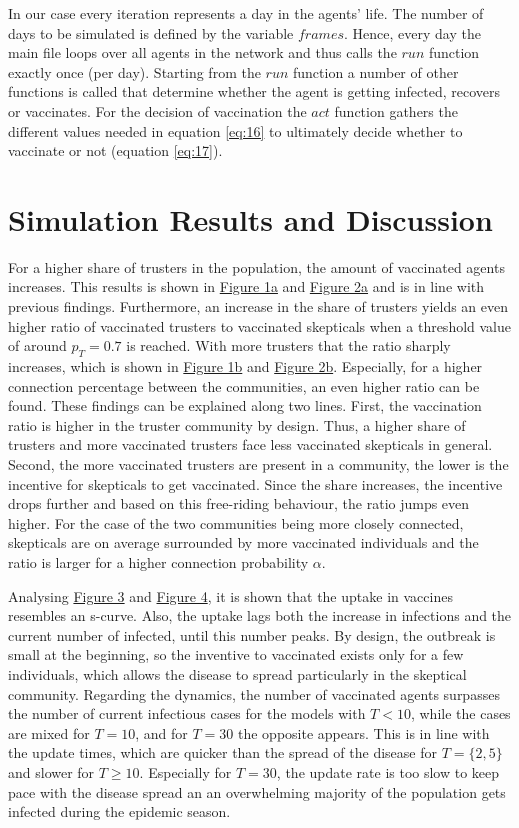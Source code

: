 \documentclass[11pt]{article}
\begin{document}
In our case every iteration represents a day in the agents' life. The number of days to be simulated is defined by the variable $frames$.
Hence, every day the main file loops over all agents in the network and thus calls the $run$ function exactly once (per day). Starting from the $run$ function a number of other functions is called that determine whether the agent is getting infected, recovers or vaccinates. For the decision of vaccination the $act$ function gathers the different values needed in equation \eqref{eq:16} to ultimately decide whether to vaccinate or not (equation \eqref{eq:17}).


\section{Simulation Results and Discussion}
\label{sec:SR}

For a higher share of trusters in the population, the amount of vaccinated agents increases. This results is shown in \hyperref[fig:1a]{Figure 1a} and \hyperref[fig:2a]{Figure 2a} and is in line with previous findings.  
Furthermore, an increase in the share of trusters yields an even higher ratio of vaccinated trusters to vaccinated skepticals when a threshold value of around \(p_{T}=0.7\) is reached. With more trusters that the ratio sharply increases, which is shown in \hyperref[fig:1a]{Figure 1b} and \hyperref[fig:2a]{Figure 2b}. Especially, for a higher connection percentage between the communities, an even higher ratio can be found. These findings can be explained along two lines. First, the vaccination ratio is higher in the truster community by design. Thus, a higher share of trusters and more vaccinated trusters face less vaccinated skepticals in general. Second, the more vaccinated trusters are present in a community, the lower is the incentive for skepticals to get vaccinated. Since the share increases, the incentive drops further and based on this free-riding behaviour, the ratio jumps even higher. For the case of the two communities being more closely connected, skepticals are on average surrounded by more vaccinated individuals and the ratio is larger for a higher connection probability \(\alpha\). 

Analysing \hyperref[fig:3a]{Figure 3} and \hyperref[fig:4a]{Figure 4}, it is shown that the uptake in vaccines resembles an s-curve. Also, the uptake lags both the increase in infections and the current number of infected, until this number peaks. By design, the outbreak is small at the beginning, so the inventive to vaccinated exists only for a few individuals, which allows the disease to spread particularly in the skeptical community. Regarding the dynamics, the number of vaccinated agents surpasses the number of current infectious cases for the models with \(T<10\), while the cases are mixed for \(T=10\), and for \(T=30\) the opposite appears. This is in line with the update times, which are quicker than the spread of the disease for \(T=\{2,5\}\) and slower for \(T\geq 10\). Especially for \(T=30\), the update rate is too slow to keep pace with the disease spread an an overwhelming majority of the population gets infected during the epidemic season. 
\end{document}
